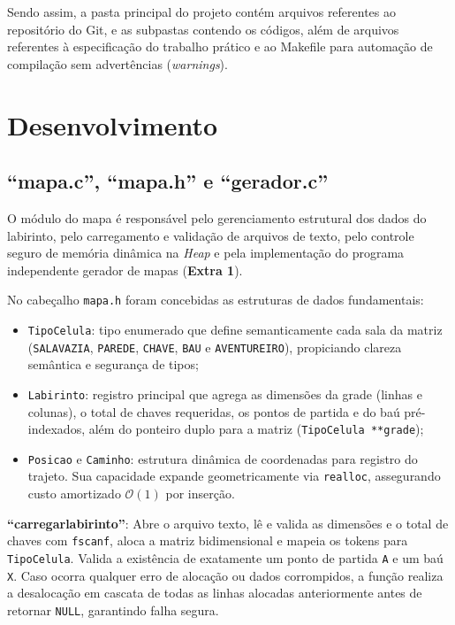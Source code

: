 \documentclass[12pt,a4paper]{article}
\renewcommand{\_}{\textunderscore\allowbreak}
\begin{document}
Sendo assim, a pasta principal do projeto contém arquivos referentes ao repositório do Git, e as subpastas contendo os códigos, além de arquivos referentes à especificação do trabalho prático e ao Makefile para automação de compilação sem advertências (\textit{warnings}).

\section{Desenvolvimento}

\subsection{“mapa.c”, “mapa.h” e “gerador.c”}

O módulo do mapa é responsável pelo gerenciamento estrutural dos dados do labirinto, pelo carregamento e validação de arquivos de texto, pelo controle seguro de memória dinâmica na \textit{Heap} e pela implementação do programa independente gerador de mapas (\textbf{Extra 1}).

No cabeçalho \texttt{mapa.h} foram concebidas as estruturas de dados fundamentais:
\begin{itemize}
    \item \texttt{TipoCelula}: tipo enumerado que define semanticamente cada sala da matriz (\texttt{SALA\_VAZIA}, \texttt{PAREDE}, \texttt{CHAVE}, \texttt{BAU} e \texttt{AVENTUREIRO}), propiciando clareza semântica e segurança de tipos;
    \item \texttt{Labirinto}: registro principal que agrega as dimensões da grade (linhas e colunas), o total de chaves requeridas, os pontos de partida e do baú pré-indexados, além do ponteiro duplo para a matriz (\texttt{TipoCelula **grade});
    \item \texttt{Posicao} e \texttt{Caminho}: estrutura dinâmica de coordenadas para registro do trajeto. Sua capacidade expande geometricamente via \texttt{realloc}, assegurando custo amortizado $\mathcal{O}(1)$ por inserção.
\end{itemize}

\textbf{“carregar\_labirinto”}: Abre o arquivo texto, lê e valida as dimensões e o total de chaves com \texttt{fscanf}, aloca a matriz bidimensional e mapeia os tokens para \texttt{TipoCelula}. Valida a existência de exatamente um ponto de partida \texttt{A} e um baú \texttt{X}. Caso ocorra qualquer erro de alocação ou dados corrompidos, a função realiza a desalocação em cascata de todas as linhas alocadas anteriormente antes de retornar \texttt{NULL}, garantindo falha segura.
\end{document}
